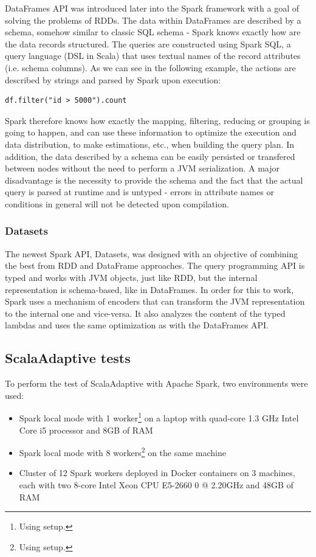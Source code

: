 DataFrames API was introduced later into the Spark framework with a goal of solving the problems of RDDs. The data within DataFrames are described by a schema, somehow similar to classic SQL schema - Spark knows exactly how are the data records structured. The queries are constructed using Spark SQL, a query language (DSL in Scala) that uses textual names of the record attributes (i.e. schema columns). As we can see in the following example, the actions are described by strings and parsed by Spark upon execution:

\lstset{style=Scala}
\begin{lstlisting}
df.filter("id > 5000").count
\end{lstlisting}

Spark therefore knows how exactly the mapping, filtering, reducing or grouping is going to happen, and can use these information to optimize the execution and data distribution, to make estimations, etc., when building the query plan. In addition, the data described by a schema can be easily persisted or transfered between nodes without the need to perform a JVM serialization. A major disadvantage is the necessity to provide the schema and the fact that the actual query is parsed at runtime and is untyped - errors in attribute names or conditions in general will not be detected upon compilation.

\subsubsection{Datasets}

The newest Spark API, Datasets, was designed with an objective of combining the best from RDD and DataFrame approaches. The query programming API is typed and works with JVM objects, just like RDD, but the internal representation is schema-based, like in DataFrames. In order for this to work, Spark uses a mechanism of encoders that can transform the JVM representation to the internal one and vice-versa. It also analyzes the content of the typed lambdas and uses the same optimization as with the DataFrames API.

\subsection{ScalaAdaptive tests}

To perform the test of ScalaAdaptive with Apache Spark, two environments were used:

\begin{itemize}
	\item Spark local mode with 1 worker\footnote{Using  setup.} on a laptop with quad-core 1.3 GHz Intel Core i5 processor and 8GB of RAM
	\item Spark local mode with 8 workers\footnote{Using  setup.} on the same machine
	\item Cluster of 12 Spark workers deployed in Docker containers on 3 machines, each with two 8-core Intel Xeon CPU E5-2660 0 @ 2.20GHz and 48GB of RAM
\end{itemize}

